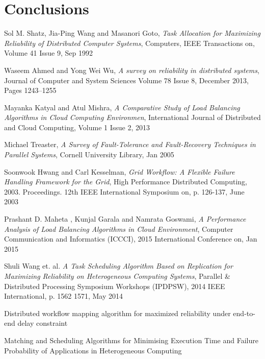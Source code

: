 \documentclass{cslthse-msc}
\begin{document}
\chapter{Conclusions} \label{ch:conclusions}

\begin{thebibliography}{50}

	Sol M. Shatz, Jia-Ping Wang and Masanori Goto,
	\emph{Task Allocation for Maximizing Reliability of Distributed Computer Systems},
	Computers, IEEE Transactions on, Volume 41  Issue 9,
	Sep 1992
	
	Waseem Ahmed and Yong Wei Wu,
	\emph{A survey on reliability in distributed systems},
	Journal of Computer and System Sciences Volume 78 Issue 8,
	December 2013, Pages 1243–1255

	Mayanka Katyal and Atul Mishra,
	\emph{A Comparative Study of Load Balancing Algorithms in Cloud Computing Environmen},
	International Journal of Distributed and Cloud Computing, Volume 1 Issue 2,
	2013

	Michael Treaster,
	\emph{A Survey of Fault-Tolerance and Fault-Recovery Techniques in Parallel Systems},
	Cornell University Library,
	Jan 2005

	Soonwook Hwang and Carl Kesselman,
	\emph{Grid Workflow: A Flexible Failure Handling Framework for the Grid},
	High Performance Distributed Computing, 2003. Proceedings. 12th IEEE International Symposium on, p. 	126-137, 
	June 2003

	Prashant D. Maheta , Kunjal Garala and Namrata Goswami,
	\emph{A Performance Analysis of Load Balancing Algorithms in Cloud Environment},
	Computer Communication and Informatics (ICCCI), 2015 International Conference on,
	Jan 2015
	
	Shuli Wang et. al.
	\emph{A Task Scheduling Algorithm Based on Replication for Maximizing Reliability on Heterogeneous Computing Systems},
	Parallel \& Distributed Processing Symposium Workshops (IPDPSW), 2014 IEEE International, p. 1562 1571, 
	May 2014
	
Distributed workflow mapping algorithm for maximized reliability under end-to-end delay constraint

Matching and Scheduling Algorithms for Minimising Execution Time and Failure Probability of Applications in Heterogeneous Computing


\end{thebibliography}
\end{document}

